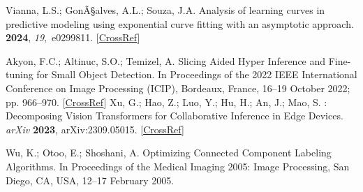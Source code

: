 \documentclass[12pt,a4paper,oneside]{report}
\begin{document}
\begin{thebibliography}{999}
Vianna, L.S.; GonÃ§alves, A.L.; Souza, J.A.
\newblock Analysis of learning curves in predictive modeling using exponential
curve fitting with an asymptotic approach.
 {\bf 2024}, {\em 19},~e0299811. [\href{http://dx.doi.org/10.1371/journal.pone.0299811}{CrossRef}]


Akyon, F.C.; Altinuc, S.O.; Temizel, A.
\newblock Slicing {{Aided Hyper Inference}} and {{Fine-tuning}} for {{Small
Object Detection}}.
\newblock In Proceedings of the 2022 {{IEEE International Conference}} on
{{Image Processing}} ({{ICIP}}), Bordeaux, France, 16--19 October 2022; pp. 966--970. [\href{http://dx.doi.org/10.1109/ICIP46576.2022.9897990}{CrossRef}]
\newpage
{}
Xu, G.; Hao, Z.; Luo, Y.; Hu, H.; An, J.; Mao, S.
: {{Decomposing Vision Transformers}} for {{Collaborative
Inference}} in {{Edge Devices}}. {\em arXiv} {\bf 2023}, arXiv:2309.05015. [\href{http://dx.doi.org/10.1109/TMC.2023.3315138}{CrossRef}]

Wu, K.; Otoo, E.; Shoshani, A.
\newblock Optimizing Connected Component Labeling Algorithms. In Proceedings of the Medical Imaging 2005: Image Processing, San Diego, CA, USA, 12--17 February 2005. 

\end{thebibliography}



\end{document}
